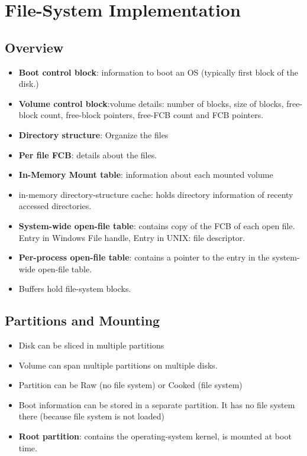 \documentclass[10pt]{report}
\begin{document}
	\section{File-System Implementation}
		\subsection{Overview}
			\begin{itemize}
					\item \textbf{Boot control block}: information to boot an OS (typically first block of the disk.)
					\item \textbf{Volume control block}:volume details: number of blocks, size of blocks, free-block count, free-block pointers, free-FCB count and FCB pointers.
					\item \textbf{Directory structure}: Organize the files
					\item \textbf{Per file FCB}: details about the files.
					\item \textbf{In-Memory Mount table}: information about each mounted volume
					\item in-memory directory-structure cache: holds directory information of recenty accessed directories.
					\item \textbf{System-wide open-file table}: contains copy of the FCB of each open file. Entry in Windows File handle, Entry in UNIX: file descriptor.
					\item \textbf{Per-process open-file table}: contains a pointer to the entry in the system-wide open-file table.
					\item Buffers hold file-system blocks.
			\end{itemize}

		\subsection{Partitions and Mounting}
			\begin{itemize}
				\item Disk can be sliced in multiple partitions
				\item Volume can span multiple partitions on multiple disks.
				\item Partition can be Raw (no file system) or Cooked (file system)
				\item Boot information can be stored in a separate partition. It has no file system there (because file system is not loaded)
				\item \textbf{Root partition}: contains the operating-system kernel, is mounted at boot time.
			\end{itemize}
\end{document}

